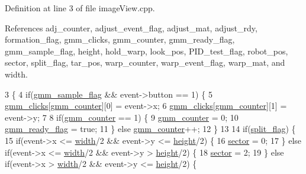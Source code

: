 Definition at line 3 of file image\+View.\+cpp.



References adj\+\_\+counter, adjust\+\_\+event\+\_\+flag, adjust\+\_\+mat, adjust\+\_\+rdy, formation\+\_\+flag, gmm\+\_\+clicks, gmm\+\_\+counter, gmm\+\_\+ready\+\_\+flag, gmm\+\_\+sample\+\_\+flag, height, hold\+\_\+warp, look\+\_\+pos, P\+I\+D\+\_\+test\+\_\+flag, robot\+\_\+pos, sector, split\+\_\+flag, tar\+\_\+pos, warp\+\_\+counter, warp\+\_\+event\+\_\+flag, warp\+\_\+mat, and width.


\begin{DoxyCode}
3                                                            \{
4     \textcolor{keywordflow}{if}(\hyperlink{class_image_view_a8256ad985182f4fdb62f15d48c9ddc9f}{gmm\_sample\_flag} && event->button == 1) \{
5         \hyperlink{class_image_view_a88c64a515c30ba486252ba440bf9f9eb}{gmm\_clicks}[\hyperlink{class_image_view_a1d02972f5193d7ce806802dd2505f1f2}{gmm\_counter}][0] = \textcolor{keyword}{event}->x;
6         \hyperlink{class_image_view_a88c64a515c30ba486252ba440bf9f9eb}{gmm\_clicks}[\hyperlink{class_image_view_a1d02972f5193d7ce806802dd2505f1f2}{gmm\_counter}][1] = \textcolor{keyword}{event}->y;
7 
8         \textcolor{keywordflow}{if}(\hyperlink{class_image_view_a1d02972f5193d7ce806802dd2505f1f2}{gmm\_counter} == 1) \{
9             \hyperlink{class_image_view_a1d02972f5193d7ce806802dd2505f1f2}{gmm\_counter} = 0;
10             \hyperlink{class_image_view_abf9a90b70c0fb02bf94a35e4a98ae50b}{gmm\_ready\_flag} = \textcolor{keyword}{true};
11         \} \textcolor{keywordflow}{else} \hyperlink{class_image_view_a1d02972f5193d7ce806802dd2505f1f2}{gmm\_counter}++;
12     \}
13 
14     \textcolor{keywordflow}{if}(\hyperlink{class_image_view_af347599c5ea679b8ed0ca867f3a942c5}{split\_flag}) \{
15         \textcolor{keywordflow}{if}(event->x <= \hyperlink{class_image_view_a5a491c5256173430d4b16d9abea80727}{width}/2 && event->y <= \hyperlink{class_image_view_a3e4a6ddf0a10ae710405cdd6e73924f6}{height}/2) \{
16             \hyperlink{class_image_view_a0a5a7071e17e23864058b755b515e9ab}{sector} = 0;
17         \} \textcolor{keywordflow}{else} \textcolor{keywordflow}{if}(event->x <= \hyperlink{class_image_view_a5a491c5256173430d4b16d9abea80727}{width}/2 && event->y > \hyperlink{class_image_view_a3e4a6ddf0a10ae710405cdd6e73924f6}{height}/2) \{
18             \hyperlink{class_image_view_a0a5a7071e17e23864058b755b515e9ab}{sector} = 2;
19         \} \textcolor{keywordflow}{else} \textcolor{keywordflow}{if}(event->x > \hyperlink{class_image_view_a5a491c5256173430d4b16d9abea80727}{width}/2 && event->y <= \hyperlink{class_image_view_a3e4a6ddf0a10ae710405cdd6e73924f6}{height}/2) \{

\end{DoxyCode}
